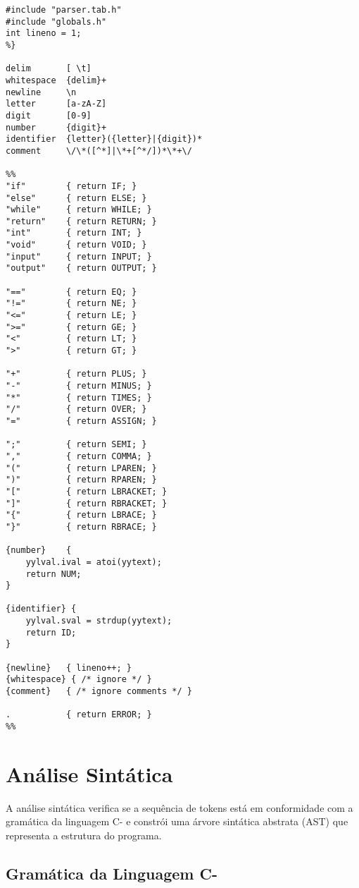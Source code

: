 \documentclass[
	12pt,				%
	oneside,
	a4paper,			%
	english,			%
	french,				%
	spanish,			%
	brazil,				%
	]{abntex2}
\begin{document}
\begin{lstlisting}[style=cstyle, caption=Especificação léxica em Flex]
%{
#include "parser.tab.h"
#include "globals.h"
int lineno = 1;
%}

delim       [ \t]
whitespace  {delim}+
newline     \n
letter      [a-zA-Z]
digit       [0-9]
number      {digit}+
identifier  {letter}({letter}|{digit})*
comment     \/\*([^*]|\*+[^*/])*\*+\/

%%
"if"        { return IF; }
"else"      { return ELSE; }
"while"     { return WHILE; }
"return"    { return RETURN; }
"int"       { return INT; }
"void"      { return VOID; }
"input"     { return INPUT; }
"output"    { return OUTPUT; }

"=="        { return EQ; }
"!="        { return NE; }
"<="        { return LE; }
">="        { return GE; }
"<"         { return LT; }
">"         { return GT; }

"+"         { return PLUS; }
"-"         { return MINUS; }
"*"         { return TIMES; }
"/"         { return OVER; }
"="         { return ASSIGN; }

";"         { return SEMI; }
","         { return COMMA; }
"("         { return LPAREN; }
")"         { return RPAREN; }
"["         { return LBRACKET; }
"]"         { return RBRACKET; }
"{"         { return LBRACE; }
"}"         { return RBRACE; }

{number}    { 
    yylval.ival = atoi(yytext);
    return NUM; 
}

{identifier} { 
    yylval.sval = strdup(yytext);
    return ID; 
}

{newline}   { lineno++; }
{whitespace} { /* ignore */ }
{comment}   { /* ignore comments */ }

.           { return ERROR; }
%%
\end{lstlisting}

\section{Análise Sintática}

A análise sintática verifica se a sequência de tokens está em conformidade com a gramática da linguagem C- e constrói uma árvore sintática abstrata (AST) que representa a estrutura do programa.

\subsection{Gramática da Linguagem C-}
\end{document}
